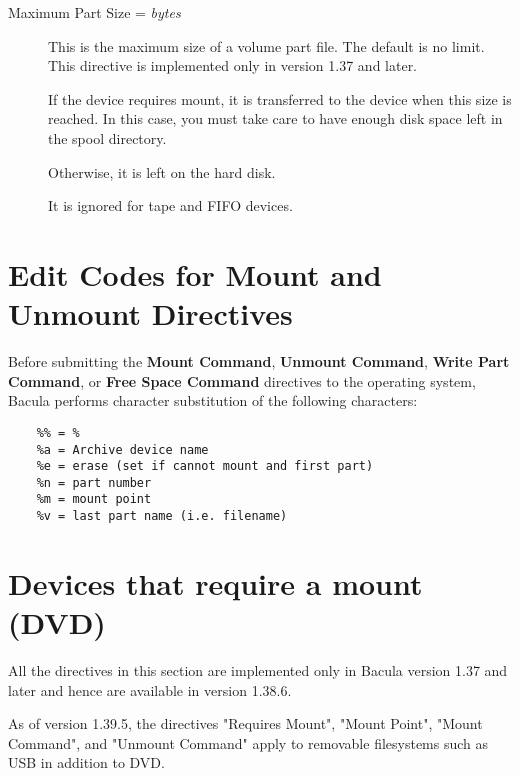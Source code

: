 \begin{description}
\item [Maximum Part Size = {\it bytes}]
   This is the maximum size of a volume part file. The default is no limit.
   This directive is implemented only in version 1.37 and later.

   If the device requires  mount, it is transferred to the device when this size
   is reached.  In this case, you must take care to have enough disk space left
   in  the spool directory.  

   Otherwise, it is left on the hard disk.  

   It is ignored for tape and FIFO devices.  


\end{description}

\label{mountcodes}
\section{Edit Codes for Mount and Unmount Directives} 

Before submitting the {\bf Mount Command}, {\bf Unmount Command}, 
{\bf Write Part Command}, or {\bf Free Space Command} directives 
to the operating system, Bacula performs character substitution of the
following characters:

\footnotesize
\begin{verbatim}
    %% = %
    %a = Archive device name
    %e = erase (set if cannot mount and first part)
    %n = part number
    %m = mount point
    %v = last part name (i.e. filename)
\end{verbatim}
\normalsize


\section{Devices that require a mount (DVD)}

All the directives in this section are implemented only in
Bacula version 1.37 and later and hence are available in version 1.38.6.

As of version 1.39.5, the directives
"Requires Mount", "Mount Point", "Mount Command", and "Unmount Command"
apply to removable filesystems such as USB in addition to DVD.

